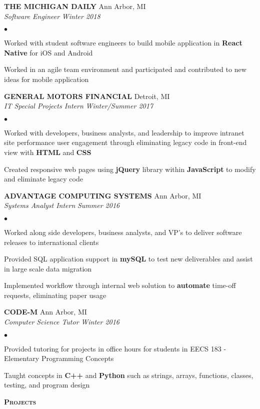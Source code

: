 \documentclass{article}
\newcommand{\lineunder}{\vspace*{-8pt} \\ \hspace*{-18pt} \hrulefill \\}
\newcommand{\header}[1]{{\hspace*{-15pt}\vspace*{6pt} \textsc{#1}} 
\vspace*{-6pt} \lineunder}
\newcommand{\employer}[4]{{ \textbf{\uppercase{#1}} \hfill#2\\ 
\emph{#3}} \hfill\textit{#4} \vspace*{1pt}}
\newenvironment{achievements}{\begin{list}{$\bullet$}{\topsep 0pt \itemsep 
-2pt}}{\vspace*{4pt}\end{list}}
\begin{document}
\employer{The Michigan Daily}{Ann Arbor, MI}
{Software Engineer}{Winter 2018}
	\begin{achievements}
	\item Worked with student software engineers to build mobile application in \textbf{React Native} for iOS and Android
	\item Worked in an agile team environment and participated and contributed to new ideas for mobile application
	\end{achievements}

\employer{General Motors Financial}{Detroit, MI}
{IT Special Projects Intern}{Winter/Summer 2017}
	\begin{achievements}
	\item Worked with developers, business analysts, and leadership to improve intranet site performance user engagement through eliminating legacy code in front-end view with \textbf{HTML} and \textbf{CSS}
        \item Created responsive web pages using \textbf{jQuery} library within \textbf{JavaScript} to modify and eliminate legacy code
	\end{achievements}	

\employer{Advantage Computing Systems}{Ann Arbor, MI}
{Systems Analyst Intern}{Summer 2016}
	\begin{achievements}
	\item Worked along side developers, business analysts, and VP's to deliver software releases to international clients
	\item Provided SQL application support in \textbf{mySQL} to test new deliverables and assist in large scale data migration
	\item Implemented workflow through internal web solution to \textbf{automate} time-off requests, eliminating paper usage
	\end{achievements}
	
\employer{Code-M}{Ann Arbor, MI}
{Computer Science Tutor}{Winter 2016}
	\begin{achievements}
	\item Provided tutoring for projects in office hours for students in EECS 183 - Elementary Programming Concepts
	\item Taught concepts in \textbf{C++} and \textbf{Python} such as strings, arrays, functions, classes, testing, and program design
	\end{achievements}
	
\header{\textbf{Projects}}
\end{document}
